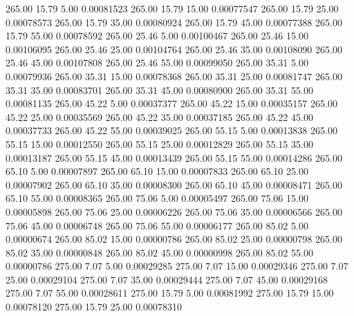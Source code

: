     265.00     15.79      5.00     0.00081523
    265.00     15.79     15.00     0.00077547
    265.00     15.79     25.00     0.00078573
    265.00     15.79     35.00     0.00080924
    265.00     15.79     45.00     0.00077388
    265.00     15.79     55.00     0.00078592
    265.00     25.46      5.00     0.00100467
    265.00     25.46     15.00     0.00106095
    265.00     25.46     25.00     0.00104764
    265.00     25.46     35.00     0.00108090
    265.00     25.46     45.00     0.00107808
    265.00     25.46     55.00     0.00099050
    265.00     35.31      5.00     0.00079936
    265.00     35.31     15.00     0.00078368
    265.00     35.31     25.00     0.00081747
    265.00     35.31     35.00     0.00083701
    265.00     35.31     45.00     0.00080900
    265.00     35.31     55.00     0.00081135
    265.00     45.22      5.00     0.00037377
    265.00     45.22     15.00     0.00035157
    265.00     45.22     25.00     0.00035569
    265.00     45.22     35.00     0.00037185
    265.00     45.22     45.00     0.00037733
    265.00     45.22     55.00     0.00039025
    265.00     55.15      5.00     0.00013838
    265.00     55.15     15.00     0.00012550
    265.00     55.15     25.00     0.00012829
    265.00     55.15     35.00     0.00013187
    265.00     55.15     45.00     0.00013439
    265.00     55.15     55.00     0.00014286
    265.00     65.10      5.00     0.00007897
    265.00     65.10     15.00     0.00007833
    265.00     65.10     25.00     0.00007902
    265.00     65.10     35.00     0.00008300
    265.00     65.10     45.00     0.00008471
    265.00     65.10     55.00     0.00008365
    265.00     75.06      5.00     0.00005497
    265.00     75.06     15.00     0.00005898
    265.00     75.06     25.00     0.00006226
    265.00     75.06     35.00     0.00006566
    265.00     75.06     45.00     0.00006748
    265.00     75.06     55.00     0.00006177
    265.00     85.02      5.00     0.00000674
    265.00     85.02     15.00     0.00000786
    265.00     85.02     25.00     0.00000798
    265.00     85.02     35.00     0.00000848
    265.00     85.02     45.00     0.00000998
    265.00     85.02     55.00     0.00000786
    275.00      7.07      5.00     0.00029285
    275.00      7.07     15.00     0.00029346
    275.00      7.07     25.00     0.00029104
    275.00      7.07     35.00     0.00029444
    275.00      7.07     45.00     0.00029168
    275.00      7.07     55.00     0.00028611
    275.00     15.79      5.00     0.00081992
    275.00     15.79     15.00     0.00078120
    275.00     15.79     25.00     0.00078310
